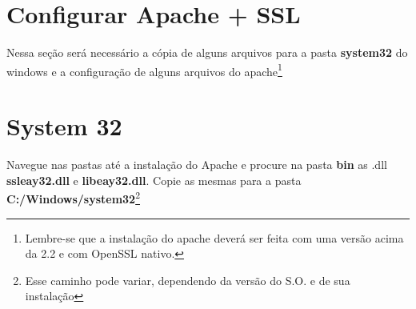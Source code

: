 \documentclass[a4paper,10pt]{article}
\begin{document}
\section{Configurar Apache + SSL}
Nessa seção será necessário a cópia de alguns arquivos para a pasta \textbf{system32} do windows e a configuração de alguns arquivos do apache\footnote{Lembre-se que a instalação do apache deverá ser feita com uma versão acima da 2.2 e com OpenSSL nativo.}
\section{System 32}
Navegue nas pastas até a instalação do Apache e procure na pasta \textbf{bin} as .dll \textbf{ssleay32.dll} e \textbf{libeay32.dll}. Copie as mesmas para a pasta \textbf{C:/Windows/system32}\footnote{Esse caminho pode variar, dependendo da versão do S.O. e de sua instalação}
\end{document}
